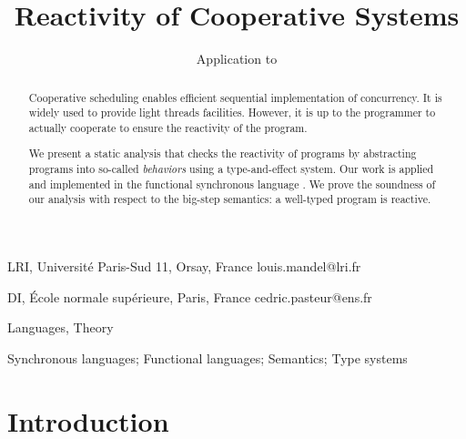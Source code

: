 \documentclass[9pt,preprint]{sigplanconf}
\begin{document}
\newtheorem{theorem}{Theorem}[section]
\newtheorem{property}{Property}
\newtheorem{lemma}{Lemma}
\newtheorem{hypothesis}{Hypothesis}

\theoremstyle{definition}
\newtheorem{definition}{Definition}

\title{Reactivity of Cooperative Systems}
\subtitle{Application to \rml}

{LRI, Universit\'e Paris-Sud 11, Orsay, France}
{louis.mandel@lri.fr}

{DI, \'Ecole normale sup\'erieure, Paris, France}
{cedric.pasteur@ens.fr}

\maketitle

\begin{abstract}
Cooperative scheduling enables efficient sequential implementation of concurrency. It is widely used to provide light threads facilities. However, it is up to the programmer to actually cooperate to ensure the reactivity of the program. 

We present a static analysis that checks the reactivity of programs by abstracting programs into so-called \emph{behaviors} using a type-and-effect system. Our work is applied and implemented in the functional synchronous language \rml. We prove the soundness of our analysis with respect to the big-step semantics: a well-typed program is reactive.
\end{abstract}


\terms
Languages, Theory

\keywords
Synchronous languages; Functional languages;  Semantics; Type systems

\section{Introduction}
\label{sec:introduction}
\end{document}
